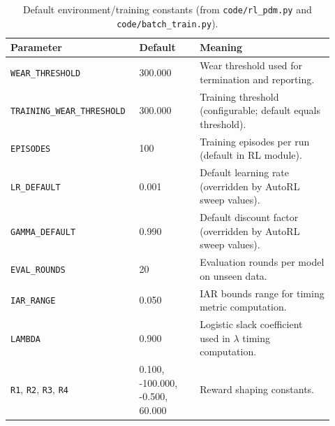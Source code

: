 \documentclass[11pt]{article}
\begin{document}
\begin{table}[t]
\centering
\caption{Default environment/training constants (from \texttt{code/rl\_pdm.py} and \texttt{code/batch\_train.py}).}
\label{tab:defaults}
\begin{tabular}{p{0.34\linewidth} p{0.18\linewidth} p{0.40\linewidth}}
\toprule
\rowcolor{gray!20} \textbf{Parameter} & \textbf{Default} & \textbf{Meaning}\\
\midrule
\texttt{WEAR\_THRESHOLD} & 300.000 & Wear threshold used for termination and reporting.\\
\texttt{TRAINING\_WEAR\_THRESHOLD} & 300.000 & Training threshold (configurable; default equals threshold).\\
\texttt{EPISODES} & 100 & Training episodes per run (default in RL module).\\
\texttt{LR\_DEFAULT} & 0.001 & Default learning rate (overridden by AutoRL sweep values).\\
\texttt{GAMMA\_DEFAULT} & 0.990 & Default discount factor (overridden by AutoRL sweep values).\\
\texttt{EVAL\_ROUNDS} & 20 & Evaluation rounds per model on unseen data.\\
\texttt{IAR\_RANGE} & 0.050 & IAR bounds range for timing metric computation.\\
\texttt{LAMBDA} & 0.900 & Logistic slack coefficient used in $\lambda$ timing computation.\\
\texttt{R1}, \texttt{R2}, \texttt{R3}, \texttt{R4} & 0.100, -100.000, -0.500, 60.000 & Reward shaping constants.\\
\bottomrule
\end{tabular}
\end{table}

\printbibliography[title={References}]
\end{document}
